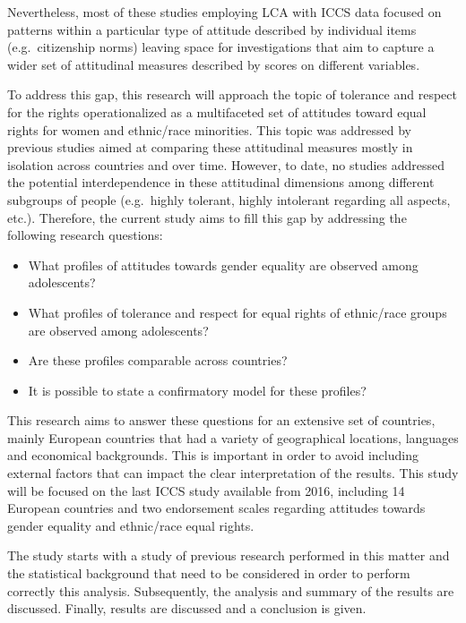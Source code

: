 \documentclass[12pt,a4paper,oneside]{reedthesis}
\providecommand{\tightlist}{%
  \setlength{\itemsep}{0pt}\setlength{\parskip}{0pt}}
\begin{document}
Nevertheless, most of these studies employing LCA with ICCS data focused on patterns within a particular type of attitude described by individual items (e.g.~citizenship norms) leaving space for investigations that aim to capture a wider set of attitudinal measures described by scores on different variables.

To address this gap, this research will approach the topic of tolerance and respect for the rights operationalized as a multifaceted set of attitudes toward equal rights for women and ethnic/race minorities. This topic was addressed by previous studies aimed at comparing these attitudinal measures mostly in isolation across countries and over time. However, to date, no studies addressed the potential interdependence in these attitudinal dimensions among different subgroups of people (e.g.~highly tolerant, highly intolerant regarding all aspects, etc.). Therefore, the current study aims to fill this gap by addressing the following research questions:
\begin{itemize}
\tightlist
\item
  What profiles of attitudes towards gender equality are observed among adolescents?\\
\item
  What profiles of tolerance and respect for equal rights of ethnic/race groups are observed among adolescents?\\
\item
  Are these profiles comparable across countries?\\
\item
  It is possible to state a confirmatory model for these profiles?
\end{itemize}
This research aims to answer these questions for an extensive set of countries, mainly European countries that had a variety of geographical locations, languages and economical backgrounds. This is important in order to avoid including external factors that can impact the clear interpretation of the results. This study will be focused on the last ICCS study available from 2016, including 14 European countries and two endorsement scales regarding attitudes towards gender equality and ethnic/race equal rights.

The study starts with a study of previous research performed in this matter and the statistical background that need to be considered in order to perform correctly this analysis. Subsequently, the analysis and summary of the results are discussed. Finally, results are discussed and a conclusion is given.
\end{document}
